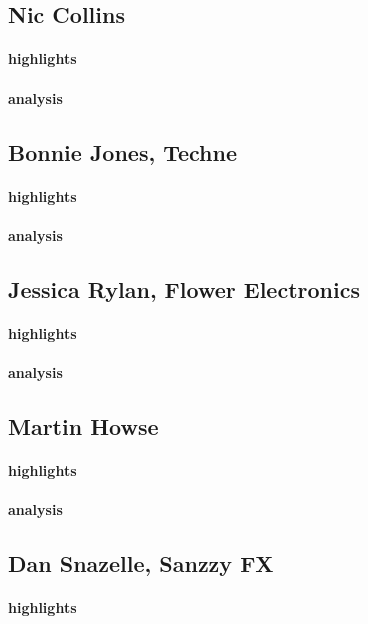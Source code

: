 \subsection{Nic Collins}
\paragraph{highlights}
\paragraph{analysis}

\subsection{Bonnie Jones, Techne}
\paragraph{highlights}
\paragraph{analysis}

\subsection{Jessica Rylan, Flower Electronics}
\paragraph{highlights}
\paragraph{analysis}

\subsection{Martin Howse}
\paragraph{highlights}
\paragraph{analysis}

\subsection{Dan Snazelle, Sanzzy FX}
\paragraph{highlights}
